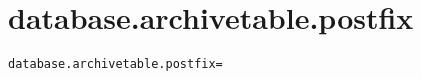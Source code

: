 \section{database.archivetable.postfix}
\label{configuration:DatabaseArchivetablePostfix}
\ClearAPI
\TODO
{}
\begin{lstlisting}[style=Props,caption={Usage example for \textit{database.archivetable.postfix}}]
database.archivetable.postfix=
\end{lstlisting}